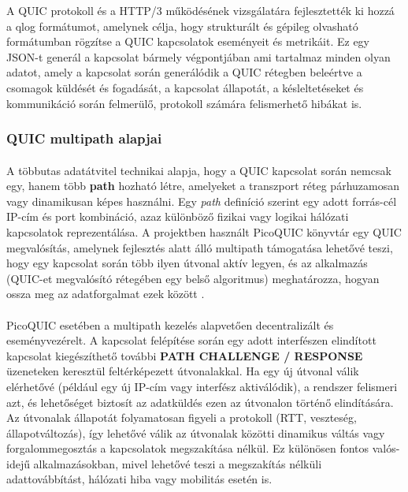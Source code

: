 \documentclass[a4paper,oneside]{article}
\begin{document}
A QUIC protokoll és a HTTP/3 működésének vizsgálatára fejlesztették ki hozzá a qlog \cite{qlog} formátumot, amelynek célja,
hogy strukturált és gépileg olvasható formátumban rögzítse a QUIC kapcsolatok eseményeit és metrikáit.
Ez egy JSON-t generál a kapcsolat bármely végpontjában ami tartalmaz minden olyan adatot, amely a 
kapcsolat során generálódik a QUIC rétegben beleértve a csomagok küldését és fogadását,
a kapcsolat állapotát, a késleltetéseket és kommunikáció során felmerülő, protokoll számára felismerhető hibákat is.


\subsubsection{QUIC multipath alapjai}
\paragraph{}
A többutas adatátvitel technikai alapja, hogy a QUIC kapcsolat során nemcsak egy, 
hanem több \textbf{path}
hozható létre, amelyeket a transzport réteg párhuzamosan vagy dinamikusan képes használni. 
Egy \emph{path} definíció szerint egy adott forrás-cél IP-cím és port kombináció, azaz 
különböző fizikai vagy logikai hálózati kapcsolatok reprezentálása. 
A projektben használt PicoQUIC könyvtár egy QUIC megvalósítás, amelynek fejlesztés alatt álló multipath 
támogatása lehetővé teszi, hogy egy kapcsolat során több ilyen útvonal aktív legyen, és az 
alkalmazás (QUIC-et megvalósító rétegében egy belső algoritmus) meghatározza, 
hogyan ossza meg az adatforgalmat ezek között \cite{pico_git}.
\paragraph{}
PicoQUIC esetében a multipath kezelés alapvetően decentralizált és eseményvezérelt. 
A kapcsolat felépítése során egy adott interfészen elindított kapcsolat kiegészíthető 
további \textbf{PATH CHALLENGE / RESPONSE} üzeneteken keresztül feltérképezett 
útvonalakkal. Ha egy új útvonal válik elérhetővé (például egy új IP-cím vagy interfész 
aktiválódik), a rendszer felismeri azt, és lehetőséget biztosít az adatküldés ezen 
az útvonalon történő elindítására. Az útvonalak állapotát folyamatosan figyeli a protokoll 
(RTT, veszteség, állapotváltozás), így lehetővé válik az útvonalak közötti dinamikus 
váltás vagy forgalommegosztás a kapcsolatok megszakítása nélkül. Ez különösen 
fontos valós-idejű alkalmazásokban, mivel lehetővé teszi a megszakítás nélküli adattovábbítást, hálózati hiba vagy mobilitás esetén is.
\end{document}
